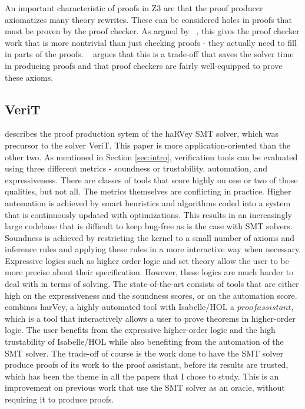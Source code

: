 \documentclass{article}
\begin{document}
An important characteristic of proofs in Z3 are that the
proof producer axiomatizes many theory rewrites. These 
can be considered holes in proofs that must be proven 
by the proof checker. As argued by
~\cite{DBLP:conf/fmcad/KatzBTRH16}, this gives the proof 
checker work that is more nontrivial than just checking 
proofs - they actually need to fill in parts of the proofs. 
~\cite{DBLP:conf/lpar/MouraB08} argues that this is a 
trade-off that saves the solver time in producing proofs 
and that proof checkers are fairly well-equipped to 
prove these axioms.

\subsection{VeriT}
\label{sec:verit}
\cite{DBLP:conf/tacas/FontaineMMNT06} describes the proof
production sytem of the haRVey SMT solver, which was 
precursor to the solver VeriT. This paper is more 
application-oriented than the other two. As mentioned in 
Section \ref{sec:intro}, verification tools can be 
evaluated using three different metrics - soundness or 
trustability, automation, and expressiveness. There are 
classes of tools that score highly on one or two of those 
qualities, but not all. The metrics themselves are conflicting
in practice. Higher automation is achieved by smart heuristics
and algorithms coded into a system that is continuously 
updated with optimizations. This results in an increasingly 
large codebase that is difficult to keep bug-free as is 
the case with SMT solvers. Soundness is achieved by 
restricting the kernel to a small number of 
axioms and inference rules and applying these 
rules in a more interactive way when necessary. 
Expressive logics such as higher order logic and 
set theory allow the user to be more precise about 
their specification. However, these logics are much
harder to deal with in terms of solving. The 
state-of-the-art consists of tools that are either high 
on the expressiveness and the soundness scores, or
on the automation score. 
\cite{DBLP:conf/tacas/FontaineMMNT06} combines harVey, 
a highly automated tool with Isabelle/HOL a $proof assistant$, 
which is a tool that interactively allows a user 
to prove theorems in higher-order logic. The user
benefits from the expressive higher-order logic and 
the high trustability of Isabelle/HOL while also 
benefiting from the automation of the SMT solver.
The trade-off of course is the work done to have 
the SMT solver produce proofs of its work to the 
proof assistant, before its results are trusted, which has 
been the theme in all the papers that I chose to study.
This is an improvement on previous work that use 
the SMT solver as an oracle, without requiring it to 
produce proofs.
\end{document}
